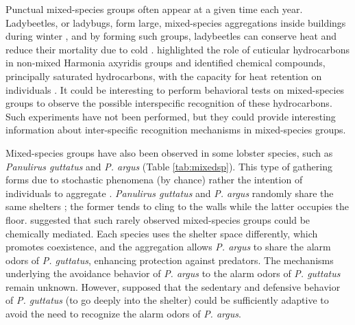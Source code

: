 Punctual mixed-species groups often appear at a given time each year. Ladybeetles, or ladybugs, form large, mixed-species aggregations inside buildings during winter \citep{simpson_aggregations_1975,lee_aggregation_1980}, and by forming such groups, ladybeetles can conserve heat and reduce their mortality due to cold \cite{copp_temperature-dependent_1983}. \citet{durieux_role_2012} highlighted the role of cuticular hydrocarbons in non-mixed Harmonia axyridis groups and identified chemical compounds, principally saturated hydrocarbons, with the capacity for heat retention on individuals \cite{durieux_role_2012}. It could be interesting to perform behavioral tests on mixed-species groups to observe the possible interspecific recognition of these hydrocarbons. Such experiments have not been performed, but they could provide interesting information about inter-specific recognition mechanisms in mixed-species groups. 

Mixed-species groups have also been observed in some lobster species, such as \textit{Panulirus guttatus} and \textit{P. argus} \citep{lozano-alvarez_coexistence_2007,briones-fourzan_influence_2008} (Table \ref{tab:mixedsp}). This type of gathering forms due to stochastic phenomena (by chance) rather the intention of individuals to aggregate \cite{briones-fourzan_influence_2008}. \textit{Panulirus guttatus} and \textit{P. argus} randomly share the same shelters \cite{lozano-alvarez_coexistence_2007}; the former tends to cling to the walls while the latter occupies the floor. \citet{briones-fourzan_influence_2008} suggested that such rarely observed mixed-species groups could be chemically mediated. Each species uses the shelter space differently, which promotes coexistence, and the aggregation allows \textit{P. argus} to share the alarm odors of \textit{P. guttatus}, enhancing protection against predators. The mechanisms underlying the avoidance behavior of \textit{P. argus} to the alarm odors of \textit{P. guttatus} remain unknown. However, \citet{briones-fourzan_influence_2008} supposed that the sedentary and defensive behavior of \textit{P. guttatus} (to go deeply into the shelter) could be sufficiently adaptive to avoid the need to recognize the alarm odors of \textit{P. argus}.

